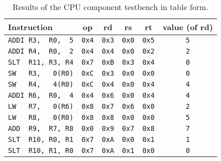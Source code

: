 \documentclass[11pt]{report}
\begin{document}
\begin{table}[ht!]
    \centering
    \begin{tabular}{|l||c|c|c|c|c|} 
     \hline
     Instruction & op & rd & rs & rt & value (of rd) \\
     \hline
     \verb|ADDI R3,  R0,  5| & \verb|0x4| & \verb|0x3| & \verb|0x0| & \verb|0x5| & \verb|5| \\ 
     \hline                                                                             
     \verb|ADDI R4,  R0,  2| & \verb|0x4| & \verb|0x4| & \verb|0x0| & \verb|0x2| & \verb|2| \\
     \hline                                                                             
     \verb|SLT  R11, R3, R4| & \verb|0x7| & \verb|0xB| & \verb|0x3| & \verb|0x4| & \verb|0| \\
     \hline                                                                             
     \verb|SW   R3,   0(R0)| & \verb|0xC| & \verb|0x3| & \verb|0x0| & \verb|0x0| & \verb|0| \\
     \hline                                                                             
     \verb|SW   R4,   4(R0)| & \verb|0xC| & \verb|0x4| & \verb|0x0| & \verb|0x4| & \verb|4| \\ 
     \hline                                                                             
     \verb|ADDI R6,  R0,  4| & \verb|0x4| & \verb|0x6| & \verb|0x0| & \verb|0x4| & \verb|4| \\
     \hline                                                                             
     \verb|LW   R7,   0(R6)| & \verb|0x8| & \verb|0x7| & \verb|0x6| & \verb|0x0| & \verb|2| \\
     \hline                                                                             
     \verb|LW   R8,   0(R0)| & \verb|0x8| & \verb|0x8| & \verb|0x0| & \verb|0x0| & \verb|5| \\
     \hline
     \verb|ADD  R9,  R7, R8| & \verb|0x0| & \verb|0x9| & \verb|0x7| & \verb|0x8| & \verb|7| \\
     \hline                                                                             
     \verb|SLT  R10, R0, R1| & \verb|0x7| & \verb|0xA| & \verb|0x0| & \verb|0x1| & \verb|1| \\
     \hline                                                                             
     \verb|SLT  R10, R1, R0| & \verb|0x7| & \verb|0xA| & \verb|0x1| & \verb|0x0| & \verb|0| \\
     \hline                                                                             
    \end{tabular}
    \caption{Results of the CPU component testbench in table form.}
    \label{table:CPU-waveform_table}
\end{table}
\end{document}
